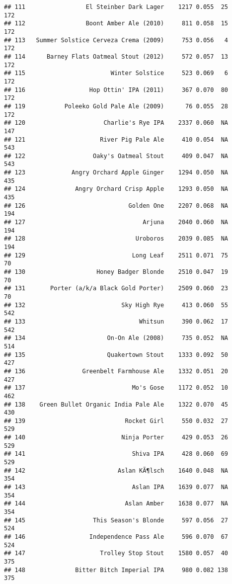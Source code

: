 \documentclass[
]{article}
\begin{document}
\begin{verbatim}
## 111                 El Steinber Dark Lager    1217 0.055  25        172
## 112                 Boont Amber Ale (2010)     811 0.058  15        172
## 113   Summer Solstice Cerveza Crema (2009)     753 0.056   4        172
## 114      Barney Flats Oatmeal Stout (2012)     572 0.057  13        172
## 115                        Winter Solstice     523 0.069   6        172
## 116                  Hop Ottin' IPA (2011)     367 0.070  80        172
## 119           Poleeko Gold Pale Ale (2009)      76 0.055  28        172
## 120                      Charlie's Rye IPA    2337 0.060  NA        147
## 121                     River Pig Pale Ale     410 0.054  NA        543
## 122                   Oaky's Oatmeal Stout     409 0.047  NA        543
## 123             Angry Orchard Apple Ginger    1294 0.050  NA        435
## 124              Angry Orchard Crisp Apple    1293 0.050  NA        435
## 126                             Golden One    2207 0.068  NA        194
## 127                                 Arjuna    2040 0.060  NA        194
## 128                               Uroboros    2039 0.085  NA        194
## 129                              Long Leaf    2511 0.071  75         70
## 130                    Honey Badger Blonde    2510 0.047  19         70
## 131       Porter (a/k/a Black Gold Porter)    2509 0.060  23         70
## 132                           Sky High Rye     413 0.060  55        542
## 133                                Whitsun     390 0.062  17        542
## 134                       On-On Ale (2008)     735 0.052  NA        514
## 135                       Quakertown Stout    1333 0.092  50        427
## 136                Greenbelt Farmhouse Ale    1332 0.051  20        427
## 137                              Mo's Gose    1172 0.052  10        462
## 138    Green Bullet Organic India Pale Ale    1322 0.070  45        430
## 139                            Rocket Girl     550 0.032  27        529
## 140                           Ninja Porter     429 0.053  26        529
## 141                              Shiva IPA     428 0.060  69        529
## 142                          Aslan KÃ¶lsch    1640 0.048  NA        354
## 143                              Aslan IPA    1639 0.077  NA        354
## 144                            Aslan Amber    1638 0.077  NA        354
## 145                   This Season's Blonde     597 0.056  27        524
## 146                  Independence Pass Ale     596 0.070  67        524
## 147                     Trolley Stop Stout    1580 0.057  40        375
## 148              Bitter Bitch Imperial IPA     980 0.082 138        375

\end{verbatim}
\end{document}
